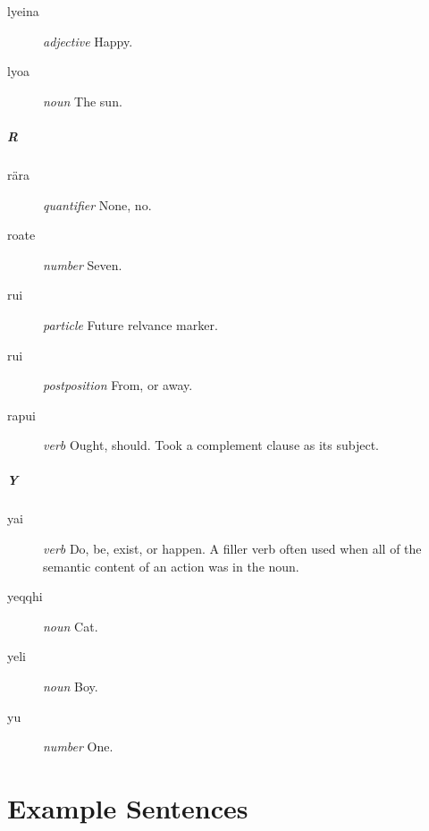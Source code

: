 \documentclass{article}
\begin{document}
\begin{description}
\item [lyeina] \emph{adjective} Happy.
\item [lyoa] \emph{noun} The sun.
\end{description}

\subsubsection{R}

\begin{description}
\item [r\"ara] \emph{quantifier} None, no.
\item [roate] \emph{number} Seven.
\item [rui] \emph{particle} Future relvance marker.
\item [rui] \emph{postposition} From, or away.
\item [rapui] \emph{verb} Ought, should. Took a complement clause as its subject.
\end{description}

\subsubsection{Y}

\begin{description}
\item [yai] \emph{verb} Do, be, exist, or happen.  A filler verb often used when all of the semantic content of an action was in the noun.
\item [yeqqhi] \emph{noun} Cat.
\item [yeli] \emph{noun} Boy.
\item [yu] \emph{number} One.
\end{description}

\part{Example Sentences}
\end{document}
